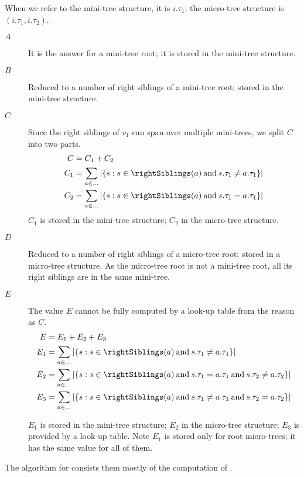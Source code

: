 When we refer to the mini-tree structure, it is $i.\tau_1$; the micro-tree structure is $(i.\tau_1, i.\tau_2)$.
\begin{description}
	\item[$A$]
	It is the answer for a mini-tree root; it is stored in the mini-tree structure.
	
	\item[$B$]
	Reduced to a number of right siblings of a mini-tree root; stored in the mini-tree structure.
	
	\item[$C$]
	Since the right siblings of $v_1$ can span over multiple mini-trees, we split $C$ into two parts.
	\begin{align*}
		C &= C_1 + C_2 \\
		C_1 &= \sum_{a \in \ldots} |\{ s : s \in \rightSiblings(a) \booland s.\tau_1 \ne a.\tau_1 \}| \\
		C_2 &= \sum_{a \in \ldots} |\{ s : s \in \rightSiblings(a) \booland s.\tau_1 = a.\tau_1 \}|
	\end{align*}
	$C_1$ is stored in the mini-tree structure; $C_2$ in the micro-tree structure.
	
	\item[$D$]
	Reduced to a number of right siblings of a micro-tree root; stored in a micro-tree structure.
	As the micro-tree root is not a mini-tree root, all its right siblings are in the same mini-tree.
	
	\item[$E$]
	The value $E$ cannot be fully computed by a look-up table from the reason as $C$.
	\begin{align*}
		E &= E_1 + E_2 + E_3 \\
		E_1 &= \sum_{a \in \ldots} |\{ s : s \in \rightSiblings(a) \booland s.\tau_1 \ne a.\tau_1 \}| \\
		E_2 &= \sum_{a \in \ldots} |\{ s : s \in \rightSiblings(a) \booland s.\tau_1 = a.\tau_1 \booland s.\tau_2 \ne a.\tau_2 \}| \\
		E_3 &= \sum_{a \in \ldots} |\{ s : s \in \rightSiblings(a) \booland s.\tau_1 \ne a.\tau_1 \booland s.\tau_2 = a.\tau_2  \}|
	\end{align*}
	
	$E_1$ is stored in the mini-tree structure; $E_2$ in the micro-tree structure; $E_3$ is provided by a look-up table.
	Note $E_1$ is stored only for root micro-trees; it has the same value for all of them.
\end{description}

The algorithm for \dfudsRank{} consists them mostly of the computation of \dfudsAnc{}.

